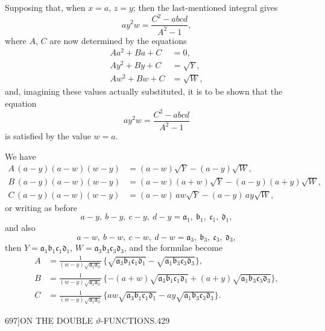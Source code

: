 \documentclass[11pt]{article}
\begin{document}
Supposing that, when $x = a$, $z = y$; then the last-mentioned integral gives
\[ ay^{2}w = \frac{C^{2} - abcd}{A^{2} - 1}, \]
where $A$, $C$ are now determined by the equations
\begin{align*}
A a^{2} + B a + C &= 0,\\
A y^{2} + B y + C &= \sqrt{Y},\\
A w^{2} + B w + C &= \sqrt{W},
\end{align*}
and, imagining these values actually substituted, it is to be shown that the equation
\[ ay^{2}w = \frac{C^{2} - abcd}{A^{2} - 1} \]
is satisfied by the value $w = a$.

We have
\begin{align*}
A\,(a - y)(a - w)(w - y) &= (a - w)\sqrt{Y} - (a - y)\sqrt{W},\\
B\,(a - y)(a - w)(w - y) &= (a - w)(a + w)\sqrt{Y} - (a - y)(a + y)\sqrt{W},\\
C\,(a - y)(a - w)(w - y) &= (a - w)\,aw\sqrt{Y} - (a - y)\,ay\sqrt{W},
\end{align*}
or writing as before
\[ a - y,\ b - y,\ c - y,\ d - y = \mathfrak{a}_{1},\ \mathfrak{b}_{1},\ \mathfrak{c}_{1},\ \mathfrak{d}_{1}, \]
and also
\[ a - w,\ b - w,\ c - w,\ d - w = \mathfrak{a}_{3},\ \mathfrak{b}_{3},\ \mathfrak{c}_{3},\ \mathfrak{d}_{3}, \]
then $Y = \mathfrak{a}_{1}\mathfrak{b}_{1}\mathfrak{c}_{1}\mathfrak{d}_{1}$, $W = \mathfrak{a}_{3}\mathfrak{b}_{3}\mathfrak{c}_{3}\mathfrak{d}_{3}$, and the formulae become
\begin{align*}
A &= \frac{1}{(w - y)\sqrt{\mathfrak{a}_{1}\mathfrak{a}_{3}}}\,\{\sqrt{\mathfrak{a}_{3}\mathfrak{b}_{1}\mathfrak{c}_{1}\mathfrak{d}_{1}} - \sqrt{\mathfrak{a}_{1}\mathfrak{b}_{3}\mathfrak{c}_{3}\mathfrak{d}_{3}}\},\\
B &= \frac{1}{(w - y)\sqrt{\mathfrak{a}_{1}\mathfrak{a}_{3}}}\,\{-(a + w)\sqrt{\mathfrak{a}_{3}\mathfrak{b}_{1}\mathfrak{c}_{1}\mathfrak{d}_{1}} + (a + y)\sqrt{\mathfrak{a}_{1}\mathfrak{b}_{3}\mathfrak{c}_{3}\mathfrak{d}_{3}}\},\\
C &= \frac{1}{(w - y)\sqrt{\mathfrak{a}_{1}\mathfrak{a}_{3}}}\,\{aw\sqrt{\mathfrak{a}_{3}\mathfrak{b}_{1}\mathfrak{c}_{1}\mathfrak{d}_{1}} - ay\sqrt{\mathfrak{a}_{1}\mathfrak{b}_{3}\mathfrak{c}_{3}\mathfrak{d}_{3}}\}.
\end{align*}

\clearpage
\begin{center}\small 697]\hfill ON THE DOUBLE $\vartheta$-FUNCTIONS.\hfill 429\end{center}
\end{document}
